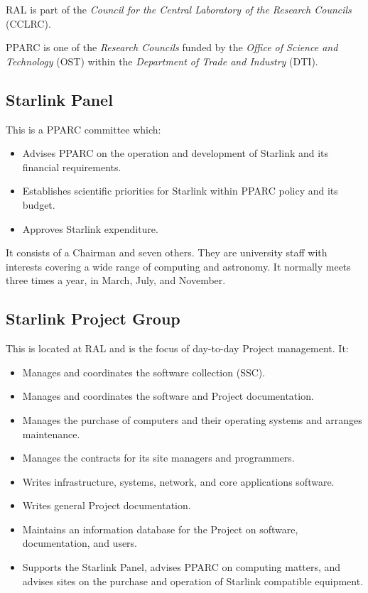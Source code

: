 \documentclass[twoside,11pt]{article}
\newcommand{\htmladdnormallink}[2]{#1}
\begin{document}
RAL is part of the
{\em Council for the Central Laboratory of the Research Councils}\/
(\htmladdnormallink{CCLRC}{http://www.cclrc.ac.uk/}).

PPARC is one of the
{\em \htmladdnormallink{Research Councils}
{http://www.nerc.ac.uk/joint_res_councils.html}}
funded by the
{\em Office of Science and Technology}\/
(\htmladdnormallink{OST}
{http://www.open.gov.uk/ost/osthome.htm})
within the
{\em Department of Trade and Industry}\/
(\htmladdnormallink{DTI}{http://www.dti.gov.uk/}).

\subsection*{Starlink Panel}

This is a PPARC committee which:

\begin{itemize}
\item Advises PPARC on the operation and development of Starlink and its
financial requirements.
\item Establishes scientific priorities for Starlink within PPARC policy and its
budget.
\item Approves Starlink expenditure.
\end{itemize}
It consists of a Chairman and seven others.
They are university staff with interests covering a wide range of computing
and astronomy.
It normally meets three times a year, in March, July, and November.

\newpage

\subsection*{Starlink Project Group}

This is located at RAL and is the focus of day-to-day Project management.
It:
\begin{itemize}
\item Manages and coordinates the software collection (SSC).
\item Manages and coordinates the software and Project documentation.
\item Manages the purchase of computers and their operating systems and
arranges maintenance.
\item Manages the contracts for its site managers and programmers.
\item Writes infrastructure, systems, network, and core applications software.
\item Writes general Project documentation.
\item Maintains an information database for the Project on software,
 documentation, and users.
\item Supports the Starlink Panel, advises PPARC on computing matters, and
advises sites on the purchase and operation of Starlink compatible equipment.
\end{itemize}
\end{document}
